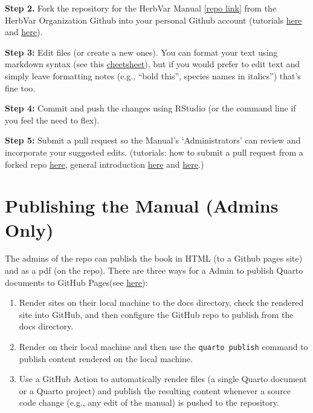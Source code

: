 \documentclass[
  letterpaper,
  oneside,
  open=any]{scrbook}
\begin{document}
\textbf{Step 2.} Fork the repository for the HerbVar Manual
\href{https://github.com/HerbVar-Network/herbvar_manual}{{[}repo
link{]}} from the HerbVar Organization Github into your personal Github
account (tutorials
\href{https://github.com/rstats-tln/fork-and-clone-repo}{here} and
\href{https://datacarpentry.org/rr-version-control/03-git-in-rstudio/}{here}).

\textbf{Step 3:} Edit files (or create a new ones). You can format your
text using markdown syntax (see this
\href{https://rstudio.github.io/cheatsheets/html/rmarkdown.html}{cheetsheet}),
but if you would prefer to edit text and simply leave formatting notes
(e.g., ``bold this'', species names in italics'') that's fine too.

\textbf{Step 4:} Commit and push the changes using RStudio (or the
command line if you feel the need to flex).

\textbf{Step 5:} Submit a pull request so the Manual's `Administrators'
can review and incorporate your suggested edits. (tutorials: how to
submit a pull request from a forked repo
\href{https://docs.github.com/en/pull-requests/collaborating-with-pull-requests/proposing-changes-to-your-work-with-pull-requests/creating-a-pull-request-from-a-fork}{here},
general introduction
\href{https://docs.github.com/en/pull-requests/collaborating-with-pull-requests/proposing-changes-to-your-work-with-pull-requests/creating-a-pull-request}{here}
and
\href{https://gcapes.github.io/swc-pr-tutorial/01-git-collaboration/index.html}{here}.)

\section{Publishing the Manual (Admins
Only)}\label{publishing-the-manual-admins-only}

The admins of the repo can publish the book in HTML (to a Github pages
site) and as a pdf (on the repo). There are three ways for a Admin to
publish Quarto documents to GitHub Pages(see
\href{https://quarto.org/docs/publishing/github-pages.html}{here}):

\begin{enumerate}
\def\labelenumi{\arabic{enumi}.}
\item
  Render sites on their local machine to the docs directory, check the
  rendered site into GitHub, and then configure the GitHub repo to
  publish from the docs directory.
\item
  Render on their local machine and then use the
  \texttt{quarto\ publish} command to publish content rendered on the
  local machine.
\item
  Use a GitHub Action to automatically render files (a single Quarto
  document or a Quarto project) and publish the resulting content
  whenever a source code change (e.g., any edit of the manual) is pushed
  to the repository.
\end{enumerate}
\end{document}
